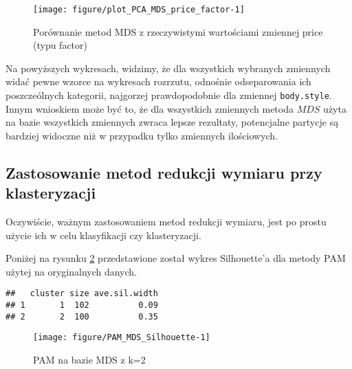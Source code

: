 \documentclass[12pt, a4paper]{article}\usepackage[]{graphicx}\usepackage[]{xcolor}
\makeatletter
\def\maxwidth{ %
  \ifdim\Gin@nat@width>\linewidth
    \linewidth
  \else
    \Gin@nat@width
  \fi
}
\newenvironment{kframe}{%
 \def\at@end@of@kframe{}%
 \ifinner\ifhmode%
  \def\at@end@of@kframe{\end{minipage}}%
  \begin{minipage}{\columnwidth}%
 \fi\fi%
 \def\FrameCommand##1{\hskip\@totalleftmargin \hskip-\fboxsep
 \colorbox{shadecolor}{##1}\hskip-\fboxsep
     \hskip-\linewidth \hskip-\@totalleftmargin \hskip\columnwidth}%
 \MakeFramed {\advance\hsize-\width
   \@totalleftmargin\z@ \linewidth\hsize
   \@setminipage}}%
 {\par\unskip\endMakeFramed%
 \at@end@of@kframe}
\newenvironment{knitrout}{}{} %
\makeatother
\begin{document}
\begin{knitrout}
\color{fgcolor}\begin{figure}[H]

{\centering \texttt{[image: figure/plot\_PCA\_MDS\_price\_factor-1]} 

}

\caption[Porównanie metod MDS z rzeczywistymi wartościami zmiennej price (typu factor)]{Porównanie metod MDS z rzeczywistymi wartościami zmiennej price (typu factor)}\label{fig:plot_PCA_MDS_price_factor}
\end{figure}

\end{knitrout}

Na powyższych wykresach, widzimy, że dla wszystkich wybranych zmiennych widać pewne wzorce na wykresach rozrzutu, odnośnie odseparowania ich poszczeólnych kategorii, najgorzej prawdopodobnie dla zmiennej \texttt{body.style}. Innym wnioskiem może być to, że dla wszystkich zmiennych metoda $MDS$ użyta na bazie wszystkich zmiennych zwraca lepsze rezultaty, potencjalne partycje są bardziej widoczne niż w przypadku tylko zmiennych ilościowych.

\subsection{Zastosowanie metod redukcji wymiaru przy klasteryzacji}

Oczywiście, ważnym zastosowaniem metod redukcji wymiaru, jest po prostu użycie ich w celu klasyfikacji czy klasteryzacji.
\par Poniżej na rysunku \ref{fig:PAM_MDS_Silhouette} przedstawione został wykres Silhouette'a dla metody PAM użytej na oryginalnych danych.

\begin{knitrout}
\color{fgcolor}\begin{kframe}
\begin{verbatim}
##   cluster size ave.sil.width
## 1       1  102          0.09
## 2       2  100          0.35
\end{verbatim}
\end{kframe}\begin{figure}[H]

{\centering \texttt{[image: figure/PAM\_MDS\_Silhouette-1]} 

}

\caption[PAM na bazie MDS z k=2]{PAM na bazie MDS z k=2}\label{fig:PAM_MDS_Silhouette}
\end{figure}

\end{knitrout}
\end{document}

